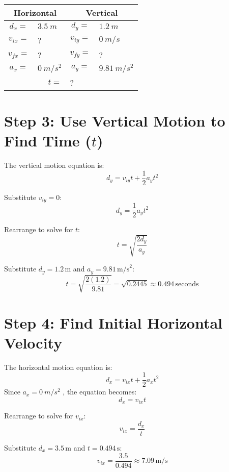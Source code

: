 \documentclass[12pt]{article}
\begin{document}
	\begin{longtable}{|c l | c l|}
		\hline
		\multicolumn{2}{|c|}{\textbf{Horizontal}} & \multicolumn{2}{|c|}{\textbf{Vertical}} \\
		\hline
		\(d_x = \) & \(\SI{3.5}{m}\) & \(d_y = \) & \(\SI{1.2}{m}\) \\
		\hline
		\(v_{ix} = \) & ? & \(v_{iy} = \) & \(\SI{0}{m/s}\) \\
		\hline
		\(v_{fx} = \) & ? & \(v_{fy} = \) & ? \\
		\hline
		\(a_x = \) & \(\SI{0}{m/s^2}\) & \(a_y = \) & \(\SI{9.81}{m/s^2}\) \\ 
		\hline
		\multicolumn{2}{|r|}{\(t =\)} & \multicolumn{2}{l|}{?}  \\
		\hline
	\end{longtable}
	
	\section*{Step 3: Use Vertical Motion to Find Time (\(t\))}
	
	The vertical motion equation is:
	\[
	d_y = v_{iy}t + \frac{1}{2}a_y t^2
	\]
	
	Substitute \(v_{iy} = 0\):
	\[
	d_y = \frac{1}{2}a_y t^2
	\]
	
	Rearrange to solve for \(t\):
	\[
	t = \sqrt{\frac{2d_y}{a_y}}
	\]
	
	Substitute \(d_y = 1.2 \, \text{m}\) and \(a_y = 9.81 \, \text{m/s}^2\):
	\[
	t = \sqrt{\frac{2(1.2)}{9.81}} = \sqrt{0.2445} \approx 0.494 \, \text{seconds}
	\]
	
	\section*{Step 4: Find Initial Horizontal Velocity}
	
	The horizontal motion equation is:
	\[
	d_x = v_{ix} t + \frac{1}{2}a_xt^2
	\]
	Since $a_x = \SI{0}{m/s^2}$ , the equation becomes:
	\[ d_x = v_{ix} t \]
	
	
	Rearrange to solve for \(v_{ix}\):
	\[
	v_{ix} = \frac{d_x}{t}
	\]
	
	Substitute \(d_x = 3.5 \, \text{m}\) and \(t = 0.494 \, \text{s}\):
	\[
	v_{ix} = \frac{3.5}{0.494} \approx 7.09 \, \text{m/s}
	\]
	

	
\end{document}
